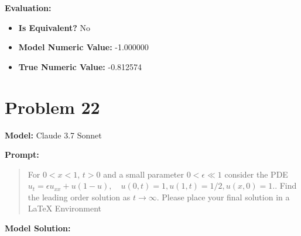 \documentclass{article}
\begin{document}
\textbf{Evaluation:}
\begin{itemize}
\item \textbf{Is Equivalent?} No
\item \textbf{Model Numeric Value:} -1.000000
\item \textbf{True Numeric Value:} -0.812574
\end{itemize}
\vspace{1cm}
\section*{Problem 22}
\textbf{Model:} Claude 3.7 Sonnet

\textbf{Prompt:}
\begin{quote}
For $0 < x < 1$, $t > 0$ and a small parameter $0 < \epsilon \ll 1$ consider the PDE $u_t = \epsilon u_{xx} + u(1-u), \quad u(0, t) = 1, u(1, t) = 1/2, u(x, 0) =1.$. Find the leading order solution as $t \to \infty$. Please place your final solution in a $\boxed{}$ LaTeX Environment
\end{quote}
\textbf{Model Solution:}
\end{document}
